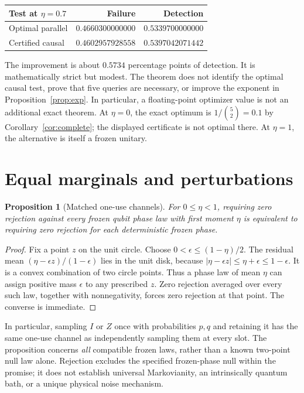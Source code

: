 \documentclass[11pt,a4paper]{article}
\newtheorem{proposition}[theorem]{Proposition}
\theoremstyle{remark}
\begin{document}
\begin{center}
\begin{tabular}{lrr}
\toprule
Test at \(\eta=0.7\) & Failure & Detection\\
\midrule
Optimal parallel & \(0.4660300000000\) & \(0.5339700000000\)\\
Certified causal & \(0.4602957928558\) & \(0.5397042071442\)\\
\bottomrule
\end{tabular}
\end{center}

The improvement is about \(0.5734\) percentage points of detection.
It is mathematically strict but modest. The theorem does not identify
the optimal causal test, prove that five queries are necessary, or
improve the exponent in Proposition~\ref{prop:exp}. In particular, a
floating-point optimizer value is not an additional exact theorem.
At \(\eta=0\), the exact optimum is \(1/\binom52=0.1\) by
Corollary~\ref{cor:complete}; the displayed certificate is not optimal
there. At \(\eta=1\), the alternative is itself a frozen unitary.

\section{Equal marginals and perturbations}

\begin{proposition}[Matched one-use channels]\label{prop:matching}
For \(0\leq\eta<1\), requiring zero rejection against every frozen qubit
phase law with first moment \(\eta\) is equivalent to requiring zero
rejection for each deterministic frozen phase.
\end{proposition}
\begin{proof}
Fix a point \(z\) on the unit circle. Choose
\(0<\epsilon\leq(1-\eta)/2\).
The residual mean \((\eta-\epsilon z)/(1-\epsilon)\) lies in the unit
disk, because \(|\eta-\epsilon z|\leq\eta+\epsilon\leq1-\epsilon\).
It is a convex combination of two circle points. Thus a phase law
of mean \(\eta\) can assign positive mass \(\epsilon\) to any prescribed
\(z\). Zero rejection averaged over every such law, together with
nonnegativity, forces zero rejection at that point. The converse is
immediate.
\end{proof}

In particular, sampling \(I\) or \(Z\) once with probabilities \(p,q\)
and retaining it has the same one-use channel as independently
sampling them at every slot. The proposition concerns \emph{all}
compatible frozen laws, rather than a known two-point null law alone.
Rejection excludes the specified frozen-phase null within the promise;
it does not establish universal Markovianity, an intrinsically quantum
bath, or a unique physical noise mechanism.
\end{document}
